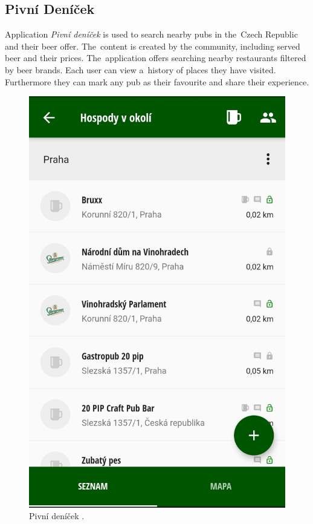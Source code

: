 \subsection{Pivní Deníček}
Application \textit{Pivní deníček} is used to search nearby pubs in the~Czech Republic and their beer offer. The~content is created by the community, including served beer and their prices. The~application offers searching nearby restaurants filtered by beer brands. Each user can view a~history of places they have visited. Furthermore they can mark any pub as their favourite and share their experience.

\begin{figure}[ht]
    \centering
    \begin{minipage}{0.45\linewidth}
        \centering
        \includegraphics[width=0.75\linewidth]{img/analysis/app-pivni-denik.jpg}
        \caption{Pivní deníček \cite{app-pivni-denik}.}
        \label{fig:pivni-denik}
    \end{minipage}\hfill
    \begin{minipage}{0.45\linewidth}
        \centering

\end{minipage}
\end{figure}
